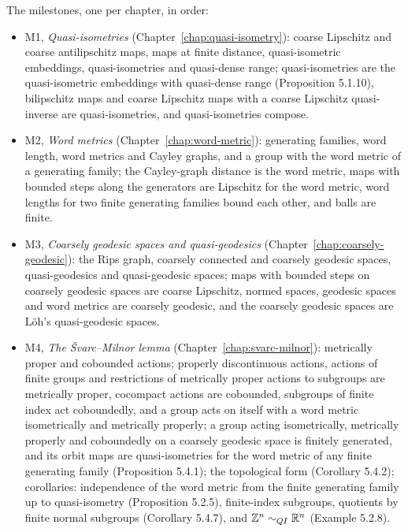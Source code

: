 The milestones, one per chapter, in order:
\begin{itemize}
  \item M1, \emph{Quasi-isometries} (Chapter~\ref{chap:quasi-isometry}): coarse Lipschitz and
        coarse antilipschitz maps, maps at finite distance, quasi-isometric embeddings,
        quasi-isometries and quasi-dense range; quasi-isometries are the quasi-isometric
        embeddings with quasi-dense range (Proposition 5.1.10), bilipschitz maps and coarse
        Lipschitz maps with a coarse Lipschitz quasi-inverse are quasi-isometries, and
        quasi-isometries compose.
  \item M2, \emph{Word metrics} (Chapter~\ref{chap:word-metric}): generating families, word
        length, word metrics and Cayley graphs, and a group with the word metric of a generating
        family; the Cayley-graph distance is the word metric, maps with bounded steps along the
        generators are Lipschitz for the word metric, word lengths for two finite generating
        families bound each other, and balls are finite.
  \item M3, \emph{Coarsely geodesic spaces and quasi-geodesics}
        (Chapter~\ref{chap:coarsely-geodesic}): the Rips graph, coarsely connected and coarsely
        geodesic spaces, quasi-geodesics and quasi-geodesic spaces; maps with bounded steps on coarsely geodesic spaces are
        coarse Lipschitz, normed spaces, geodesic spaces and word metrics are coarsely geodesic,
        and the coarsely geodesic spaces are L\"oh's quasi-geodesic spaces.
  \item M4, \emph{The \v{S}varc--Milnor lemma} (Chapter~\ref{chap:svarc-milnor}): metrically
        proper and cobounded actions; properly discontinuous actions, actions of finite groups and
        restrictions of metrically proper actions to subgroups are metrically proper, cocompact
        actions are cobounded, subgroups of finite index act coboundedly, and a group acts on
        itself with a word metric isometrically and metrically properly; a group acting
        isometrically, metrically properly and coboundedly on a coarsely geodesic space is
        finitely generated, and its orbit maps are quasi-isometries for the word metric of any
        finite generating family (Proposition 5.4.1); the topological form (Corollary 5.4.2);
        corollaries: independence of the word metric from the finite generating family up to
        quasi-isometry (Proposition 5.2.5), finite-index subgroups, quotients by finite normal
        subgroups (Corollary 5.4.7), and $\mathbb{Z}^n \sim_{QI} \mathbb{R}^n$ (Example 5.2.8).

\end{itemize}
